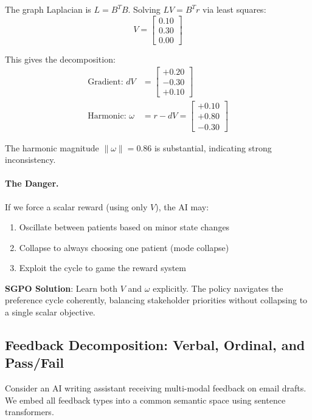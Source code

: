 The graph Laplacian is $L = B^T B$. Solving $L V = B^T r$ via least squares:
\begin{equation}
V = \begin{bmatrix} 0.10 \\ 0.30 \\ 0.00 \end{bmatrix}
\end{equation}

This gives the decomposition:
\begin{align}
\text{Gradient: } dV &= \begin{bmatrix} +0.20 \\ -0.30 \\ +0.10 \end{bmatrix} \\
\text{Harmonic: } \omega &= r - dV = \begin{bmatrix} +0.10 \\ +0.80 \\ -0.30 \end{bmatrix}
\end{align}

The harmonic magnitude $\|\omega\| = 0.86$ is substantial, indicating strong inconsistency.

\paragraph{The Danger.}
If we force a scalar reward (using only $V$), the AI may:
\begin{enumerate}
    \item Oscillate between patients based on minor state changes
    \item Collapse to always choosing one patient (mode collapse)
    \item Exploit the cycle to game the reward system
\end{enumerate}

\textbf{SGPO Solution}: Learn both $V$ and $\omega$ explicitly. The policy navigates the preference cycle coherently, balancing stakeholder priorities without collapsing to a single scalar objective.

\subsection{Feedback Decomposition: Verbal, Ordinal, and Pass/Fail}

Consider an AI writing assistant receiving multi-modal feedback on email drafts. We embed all feedback types into a common semantic space using sentence transformers.

